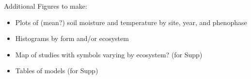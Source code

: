 \documentclass{article}
\begin{document}
 \par Additional Figures to make:
 \begin{itemize}
 \item Plots of (mean?) soil moisture and temperature by site, year, and phenophase
\item Histograms by form and/or ecosystem
 \item Map of studies with symbols varying by ecosystem? (for Supp)
\item Tables of models (for Supp)
\end{itemize}

 
 
\end{document}

